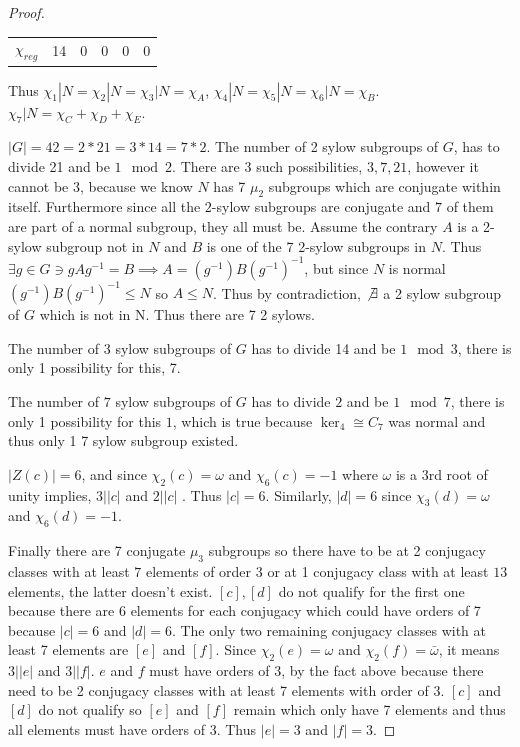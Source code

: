 \documentclass{article}
\begin{document}
\begin{proof}
\begin{tabular}{c | c c c c c }
        $\chi_{reg}$ & 14 & 0 & 0 & 0 & 0 
    \end{tabular}

    Thus $\chi_1|N = \chi_2|N = \chi_3|N = \chi_A$, $ \chi_4|N = \chi_5|N = \chi_6|N = \chi_B$. $\chi_7|N = \chi_C + \chi_D + \chi_E$.
    
    
    $|G| = 42 = 2 * 21 = 3 * 14 = 7 * 2$. The number of 2 sylow subgroups of $G$, has to divide 21 and be $1 \mod 2$. There are 3 such possibilities, $3,7, 21$, however it cannot be 3, because we know $N$ has 7 $\mu_2$ subgroups which are conjugate within itself. Furthermore since all the $2$-sylow subgroups are conjugate and $7$ of them are part of a normal subgroup, they all must be. Assume the contrary $A$ is a 2-sylow subgroup not in $N$ and $B$ is one of the 7 2-sylow subgroups in $N$. Thus $\exists g \in G \ni gAg^{-1} = B \implies A = (g^{-1})B(g^{-1})^{-1}$, but since $N$ is normal $(g^{-1})B(g^{-1})^{-1} \leq N$ so $A \leq N$. Thus by contradiction, $\not \exists$ a 2 sylow subgroup of $G$ which is not in N. Thus there are 7 2 sylows.     
    
    The number of $3$ sylow subgroups of $G$ has to divide 14 and be $1 \mod 3$, there is only 1 possibility for this, 7.
    
    The number of $7$ sylow subgroups of $G$ has to divide $2$ and be $1 \mod 7$, there is only 1 possibility for this $1$, which is true because $\ker_4 \cong C_7$ was normal and thus only 1 7 sylow subgroup existed.
    
    
    $|Z(c)| = 6$, and since $\chi_2(c) = \omega$ and $\chi_6(c) = -1$  where $\omega$ is a 3rd root of unity implies, $3 | |c|$ and $2 | |c|$ . Thus $|c| = 6$. Similarly, $|d| = 6$ since $\chi_3(d) = \omega$ and $\chi_6(d) = -1$.
    
    Finally there are 7 conjugate $\mu_3$ subgroups so there have to be at 2 conjugacy classes with at least $7$ elements of order 3 or at 1 conjugacy class with at least $13$ elements, the latter doesn't exist. $[c], [d]$ do not qualify for the first one because there are 6 elements for each conjugacy which could have orders of 7 because $|c| = 6$ and $|d| = 6$. The only two remaining conjugacy classes with at least 7 elements are $[e]$ and $[f]$. Since $\chi_2(e) = \omega$ and $\chi_2(f) = \bar{\omega}$, it means $3 | |e|$ and $3 | |f|$. $e$ and $f$ must have orders of 3, by the fact above because there need to be 2 conjugacy classes with at least 7 elements with order of 3. $[c]$ and $[d]$ do not qualify so $[e]$ and $[f]$ remain which only have 7 elements and thus all elements must have orders of 3. Thus $|e| = 3$ and $|f| = 3$.
    

\end{proof}
\end{document}
